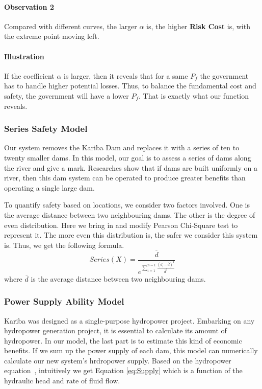 \documentclass{mcmthesis}
\begin{document}
\paragraph{Observation 2}
Compared with different curves, the larger $\alpha$ is, the higher \textbf{Risk Cost} is, with the extreme point moving left.
\paragraph{Illustration}
If the coefficient $\alpha$ is larger, then it reveals that for a same $P_f$ the government has to handle higher potential losses. Thus, to balance the fundamental cost and safety, the government will have a lower $P_f$. That is exactly what our function reveals.
\subsubsection{Series Safety Model}
Our system removes the Kariba Dam and replaces it with a series of ten to twenty smaller dams. In this model, our goal is to assess a series of dams along the river and give a mark. Researches show that if dams are built uniformly on a river, then this dam system can be operated to produce greater benefits than operating a single large dam.

To quantify safety based on locations, we consider two factors involved. One is the average distance between two neighbouring dams. The other is the degree of even distribution. Here we bring in and modify Pearson Chi-Square test to represent it. The more even this distribution is, the safer we consider this system is. Thus, we get the following formula.
\begin{equation}
\label{eq:T}
Series(X) = \frac{\overline{d}}{e^{\sum_{i=1}^{n-1}\frac{(d_i-\overline{d})^2}{\overline{d}^2}}}
\end{equation}
where $\overline{d}$ is the average distance between two neighbouring dams.
\subsubsection{Power Supply Ability Model}
Kariba was designed as a single-purpose hydropower project. Embarking on any hydropower generation project, it is essential to calculate its amount of hydropower. In our model, the last part is to estimate this kind of economic benefits. If we sum up the power supply of each dam, this model can numerically calculate our new system's hrdropower supply. Based on the hydropower equation~\cite{Wiki_Hydro}, intuitively we get Equation \eqref{eq:Supply} which is a function of the hydraulic head and rate of fluid flow.
\end{document}
